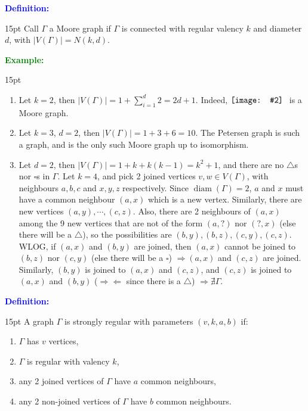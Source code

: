 \documentclass[12pt]{article}
\newcommand{\noparskip}{\vspace{-\parskip}}
\newenvironment{points}
	{\begin{enumerate}[label = (\arabic*)]}
	{\end{enumerate}}
\newenvironment{dent}
	{\begin{adjustwidth}{15pt}{}\noparskip}
	{\end{adjustwidth}}
\newenvironment{definition}
	{\textcolor{Blue}{\textbf{Definition:}}\begin{dent}}
	{\end{dent}}
\newenvironment{example}
	{\textcolor{Green}{\textbf{Example:}}\begin{dent}}
	{\end{dent}}
\newcommand{\pic}[2][1.0]{
	$\vcenter{\hbox{\texttt{[image: \#2]}\ }}$}
\renewcommand{\implies}{\Rightarrow}
\newcommand{\contradiction}{\Rightarrow \Leftarrow}
\newcommand{\sizeof}[1]{\left| #1 \right|}
\newcommand{\diam}[1]{\operatorname{diam}(#1)}
\begin{document}
\begin{definition}
Call $\Gamma$ a Moore graph if $\Gamma$ is connected with regular valency $k$ and diameter $d$, with $\sizeof{V(\Gamma)} = N(k, d)$.
\end{definition}

\begin{example}
\begin{points}
\item Let $k = 2$, then $\sizeof{V(\Gamma)} = 1 + \sum_{i = 1}^d 2 = 2d + 1$. Indeed,\pic[0.3]{9.png} is a Moore graph.
\item Let $k = 3$, $d = 2$, then $\sizeof{V(\Gamma)} = 1 + 3 + 6 = 10$. The Petersen graph is such a graph, and is the only such Moore graph up to isomorphism.
\item Let $d = 2$, then $\sizeof{V(\Gamma)} = 1 + k + k(k - 1) = k^2 + 1$, and there are no $\triangle$s nor $\square$s in $\Gamma$. Let $k = 4$, and pick 2 joined vertices $v, w \in V(\Gamma)$, with neighbours $a, b, c$ and $x, y, z$ respectively. Since $\diam{\Gamma} = 2$, $a$ and $x$ must have a common neighbour $(a, x)$ which is a new vertex. Similarly, there are new vertices $(a, y), \cdots, (c, z)$. Also, there are 2 neighbours of $(a, x)$ among the 9 new vertices that are not of the form $(a, ?)$ nor $(?, x)$ (else there will be a $\triangle$), so the possibilities are $(b, y), (b, z), (c, y), (c, z)$. WLOG, if $(a, x)$ and $(b, y)$ are joined, then $(a, x)$ cannot be joined to $(b, z)$ nor $(c, y)$ (else there will be a $\square$) $\implies (a, x)$ and $(c, z)$ are joined. Similarly, $(b, y)$ is joined to $(a, x)$ and $(c, z)$, and $(c, z)$ is joined to $(a, x)$ and $(b, y)$ ($\contradiction$ since there is a $\triangle$) $\implies \nexists \Gamma$.
\end{points}
\end{example}

\begin{definition}
A graph $\Gamma$ is strongly regular with parameters $(v, k, a, b)$ if:
\noparskip
\begin{points}
\item $\Gamma$ has $v$ vertices,
\item $\Gamma$ is regular with valency $k$,
\item any 2 joined vertices of $\Gamma$ have $a$ common neighbours,
\item any 2 non-joined vertices of $\Gamma$ have $b$ common neighbours.
\end{points}
\end{definition}
\end{document}
